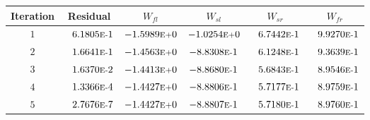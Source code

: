 \begin{tabular*}{\textwidth}{@{\extracolsep{\fill}} cccccc}
\\ 
\hline 
\hline 
Iteration & Residual & $W_{fl}$ & $W_{sl}$ & $W_{sr}$ & $W_{fr}$ \\ 
\hline 
$1$ & $\phantom{-} 6.1805\mbox{\sc{e}\smaller{-}}1$ & $-1.5989\mbox{\sc{e}\smaller{+}}0$ & $-1.0254\mbox{\sc{e}\smaller{+}}0$ & $\phantom{-} 6.7442\mbox{\sc{e}\smaller{-}}1$ & $\phantom{-} 9.9270\mbox{\sc{e}\smaller{-}}1$ \\ 
$2$ & $\phantom{-} 1.6641\mbox{\sc{e}\smaller{-}}1$ & $-1.4563\mbox{\sc{e}\smaller{+}}0$ & $-8.8308\mbox{\sc{e}\smaller{-}}1$ & $\phantom{-} 6.1248\mbox{\sc{e}\smaller{-}}1$ & $\phantom{-} 9.3639\mbox{\sc{e}\smaller{-}}1$ \\ 
$3$ & $\phantom{-} 1.6370\mbox{\sc{e}\smaller{-}}2$ & $-1.4413\mbox{\sc{e}\smaller{+}}0$ & $-8.8680\mbox{\sc{e}\smaller{-}}1$ & $\phantom{-} 5.6843\mbox{\sc{e}\smaller{-}}1$ & $\phantom{-} 8.9546\mbox{\sc{e}\smaller{-}}1$ \\ 
$4$ & $\phantom{-} 1.3366\mbox{\sc{e}\smaller{-}}4$ & $-1.4427\mbox{\sc{e}\smaller{+}}0$ & $-8.8806\mbox{\sc{e}\smaller{-}}1$ & $\phantom{-} 5.7177\mbox{\sc{e}\smaller{-}}1$ & $\phantom{-} 8.9759\mbox{\sc{e}\smaller{-}}1$ \\ 
$5$ & $\phantom{-} 2.7676\mbox{\sc{e}\smaller{-}}7$ & $-1.4427\mbox{\sc{e}\smaller{+}}0$ & $-8.8807\mbox{\sc{e}\smaller{-}}1$ & $\phantom{-} 5.7180\mbox{\sc{e}\smaller{-}}1$ & $\phantom{-} 8.9760\mbox{\sc{e}\smaller{-}}1$ \\ 
\hline 
\end{tabular*} 
